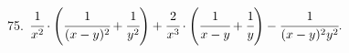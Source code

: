 75. $\cfrac{1}{x^2}\cdot\left(\cfrac{1}{(x-y)^2}+\cfrac{1}{y^2}\right)+\cfrac{2}{x^3}\cdot\left(
\cfrac{1}{x-y}+\cfrac{1}{y}\right)-\cfrac{1}{(x-y)^2y^2}.$\\
